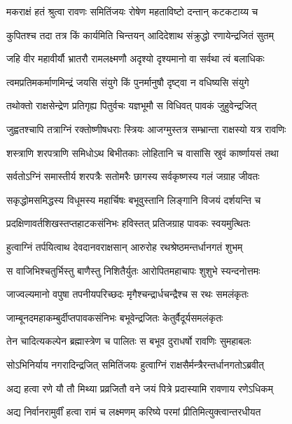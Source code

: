 
\twolineshloka
{मकराक्षं हतं श्रुत्वा रावणः समितिंजयः}
{रोषेण महताविष्टो दन्तान् कटकटाय्य च} %

\twolineshloka
{कुपितश्च तदा तत्र किं कार्यमिति चिन्तयन्}
{आदिदेशाथ संक्रुद्धो रणायेन्द्रजितं सुतम्} %

\twolineshloka
{जहि वीर महावीर्यौ भ्रातरौ रामलक्ष्मणौ}
{अदृश्यो दृश्यमानो वा सर्वथा त्वं बलाधिकः} %

\twolineshloka
{त्वमप्रतिमकर्माणमिन्द्रं जयसि संयुगे}
{किं पुनर्मानुषौ दृष्ट्वा न वधिष्यसि संयुगे} %

\twolineshloka
{तथोक्तो राक्षसेन्द्रेण प्रतिगृह्य पितुर्वचः}
{यज्ञभूमौ स विधिवत् पावकं जुहुवेन्द्रजित्} %

\twolineshloka
{जुह्वतश्चापि तत्राग्निं रक्तोष्णीषधराः स्त्रियः}
{आजग्मुस्तत्र सम्भ्रान्ता राक्षस्यो यत्र रावणिः} %

\twolineshloka
{शस्त्राणि शरपत्राणि समिधोऽथ बिभीतकाः}
{लोहितानि च वासांसि स्रुवं कार्ष्णायसं तथा} %

\twolineshloka
{सर्वतोऽग्निं समास्तीर्य शरपत्रैः सतोमरैः}
{छागस्य सर्वकृष्णस्य गलं जग्राह जीवतः} %

\twolineshloka
{सकृद्धोमसमिद्धस्य विधूमस्य महार्चिषः}
{बभूवुस्तानि लिङ्गानि विजयं दर्शयन्ति च} %

\twolineshloka
{प्रदक्षिणावर्तशिखस्तप्तहाटकसंनिभः}
{हविस्तत् प्रतिजग्राह पावकः स्वयमुत्थितः} %

\twolineshloka
{हुत्वाग्निं तर्पयित्वाथ देवदानवराक्षसान्}
{आरुरोह रथश्रेष्ठमन्तर्धानगतं शुभम्} %

\twolineshloka
{स वाजिभिश्चतुर्भिस्तु बाणैस्तु निशितैर्युतः}
{आरोपितमहाचापः शुशुभे स्यन्दनोत्तमः} %

\twolineshloka
{जाज्वल्यमानो वपुषा तपनीयपरिच्छदः}
{मृगैश्चन्द्रार्धचन्द्रैश्च स रथः समलंकृतः} %

\twolineshloka
{जाम्बूनदमहाकम्बुर्दीप्तपावकसंनिभः}
{बभूवेन्द्रजितः केतुर्वैदूर्यसमलंकृतः} %

\twolineshloka
{तेन चादित्यकल्पेन ब्रह्मास्त्रेण च पालितः}
{स बभूव दुराधर्षो रावणिः सुमहाबलः} %

\twolineshloka
{सोऽभिनिर्याय नगरादिन्द्रजित् समितिंजयः}
{हुत्वाग्निं राक्षसैर्मन्त्रैरन्तर्धानगतोऽब्रवीत्} %

\twolineshloka
{अद्य हत्वा रणे यौ तौ मिथ्या प्रव्रजितौ वने}
{जयं पित्रे प्रदास्यामि रावणाय रणेऽधिकम्} %

\twolineshloka
{अद्य निर्वानरामुर्वीं हत्वा रामं च लक्ष्मणम्}
{करिष्ये परमां प्रीतिमित्युक्त्वान्तरधीयत} %

